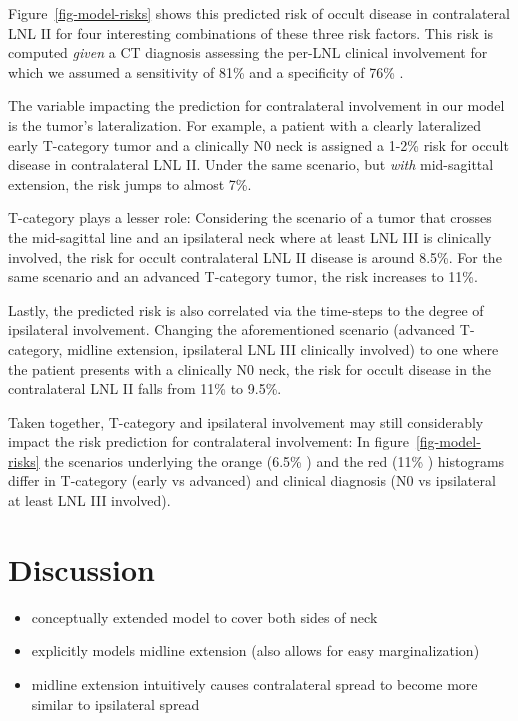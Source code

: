 \documentclass[
  sn-mathphys-num,
]{sn-jnl}
\providecommand{\tightlist}{%
  \setlength{\itemsep}{0pt}\setlength{\parskip}{0pt}}\usepackage{longtable,booktabs,array}
\begin{document}
Figure~\ref{fig-model-risks} shows this predicted risk of occult disease
in contralateral LNL II for four interesting combinations of these three
risk factors. This risk is computed \emph{given} a CT diagnosis
assessing the per-LNL clinical involvement for which we assumed a
sensitivity of 81\% and a specificity of 76\%
\citep{debondt_detection_2007}.

The variable impacting the prediction for contralateral involvement in
our model is the tumor's lateralization. For example, a patient with a
clearly lateralized early T-category tumor and a clinically N0 neck is
assigned a 1-2\% risk for occult disease in contralateral LNL II. Under
the same scenario, but \emph{with} mid-sagittal extension, the risk
jumps to almost 7\%.

T-category plays a lesser role: Considering the scenario of a tumor that
crosses the mid-sagittal line and an ipsilateral neck where at least LNL
III is clinically involved, the risk for occult contralateral LNL II
disease is around 8.5\%. For the same scenario and an advanced
T-category tumor, the risk increases to 11\%.

Lastly, the predicted risk is also correlated via the time-steps to the
degree of ipsilateral involvement. Changing the aforementioned scenario
(advanced T-category, midline extension, ipsilateral LNL III clinically
involved) to one where the patient presents with a clinically N0 neck,
the risk for occult disease in the contralateral LNL II falls from 11\%
to 9.5\%.

Taken together, T-category and ipsilateral involvement may still
considerably impact the risk prediction for contralateral involvement:
In figure~\ref{fig-model-risks} the scenarios underlying the orange
(6.5\% ) and the red (11\% ) histograms differ in T-category (early vs
advanced) and clinical diagnosis (N0 vs ipsilateral at least LNL III
involved).

\section{Discussion}\label{sec-discussion}

\begin{itemize}
\tightlist
\item
  conceptually extended model to cover both sides of neck
\item
  explicitly models midline extension (also allows for easy
  marginalization)
\item
  midline extension intuitively causes contralateral spread to become
  more similar to ipsilateral spread
\end{itemize}
\end{document}
